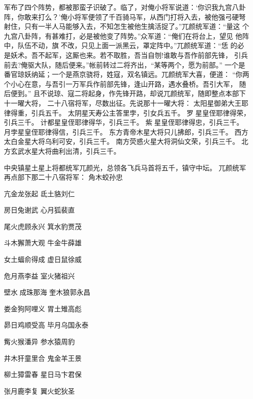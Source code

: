 军布了四个阵势，都被那蛮子识破了。临了，对俺小将军说道：‘你识我九宫八卦
阵，你敢来打么？’俺小将军便领了千百骑马军，从西门打将入去，被他强弓硬弩
射住，只有一半人马能够入去，不知怎生被他生擒活捉了。”兀颜统军道：“量这
个九宫八卦阵，有甚难打，必是被他变了阵势。”众军道：“俺们在将台上，望见
他阵中，队伍不动，旗不改，只见上面一派黑云，罩定阵中。”兀颜统军道：“恁
的必是妖术。吾不起军，这厮也来。若不取胜，吾当自刎!谁敢与吾作前部先锋，
引兵前去?俺驱大队，随后便来。”帐前转过二将齐出，“某等两个，愿为前部。”
一个是番官琼妖纳延；一个是燕京骁将，姓寇，双名镇远。兀颜统军大喜，便道：
“你两个小心在意，与吾引一万军兵作前部先锋，逢山开路，遇水叠桥。吾引大军，
随后便到。”
且不说琼、寇二将起身，作先锋开路，却说兀颜统军，随即整点本部下十一曜大将，
二十八宿将军，尽数出征。先说那十一曜大将：
太阳星御弟大王耶律得重，引兵五千。
太阴星天寿公主答里孛，引女兵五千。
罗星皇侄耶律得荣，引兵三千。
计都星皇侄耶律得华，引兵三千。
紫星皇侄耶律得忠，引兵三千。
月孛星皇侄耶律得信，引兵三千。
东方青帝木星大将只儿拂郎，引兵三千。
西方太白金星大将乌利可安，引兵三千。
南方荧惑火星大将洞仙文荣，引兵三千。
北方玄武水星大将曲利出清，引兵三千。

中央镇星土星上将都统军兀颜光，总领各飞兵马首将五千，镇守中坛。
兀颜统军再点部下那二十八宿将军：
角木蛟孙忠

亢金龙张起
氐土貉刘仁

房日兔谢武
心月狐裴直

尾火虎顾永兴
箕水豹贾茂

斗木獬萧大观
牛金牛薛雄

女土蝠俞得成
虚日鼠徐威

危月燕李益
室火猪祖兴

壁水成珠那海
奎木狼郭永昌

娄金狗阿哩义
胃土雉高彪

昴日鸡顺受高
毕月乌国永泰

觜火猴潘异
参水猿周豹

井木犴童里合
鬼金羊王景

柳土獐雷春
星日马卞君保

张月鹿李复
翼火蛇狄圣

